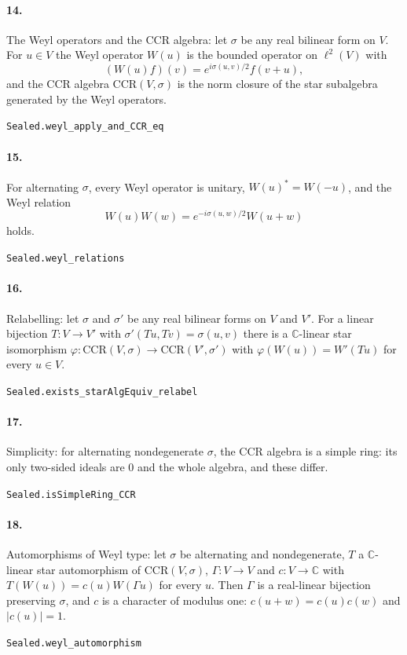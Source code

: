 \documentclass[11pt]{article}
\begin{document}
\paragraph{14.} The Weyl operators and the CCR algebra: let $\sigma$ be any real bilinear form on $V$. For $u \in V$ the Weyl operator $W(u)$ is the bounded operator on $\ell^2(V)$ with \[(W(u) f)(v) = e^{i\sigma(u, v)/2} f(v + u),\] and the CCR algebra $\mathrm{CCR}(V, \sigma)$ is the norm closure of the star subalgebra generated by the Weyl operators.\par{\footnotesize\texttt{Sealed.weyl\_apply\_and\_CCR\_eq}}

\paragraph{15.} For alternating $\sigma$, every Weyl operator is unitary, $W(u)^* = W(-u)$, and the Weyl relation \[W(u) W(w) = e^{-i\sigma(u, w)/2} W(u + w)\] holds.\par{\footnotesize\texttt{Sealed.weyl\_relations}}

\paragraph{16.} Relabelling: let $\sigma$ and $\sigma'$ be any real bilinear forms on $V$ and $V'$. For a linear bijection $T : V \to V'$ with $\sigma'(Tu, Tv) = \sigma(u, v)$ there is a $\mathbb C$-linear star isomorphism $\varphi : \mathrm{CCR}(V, \sigma) \to \mathrm{CCR}(V', \sigma')$ with $\varphi(W(u)) = W'(Tu)$ for every $u \in V$.\par{\footnotesize\texttt{Sealed.exists\_starAlgEquiv\_relabel}}

\paragraph{17.} Simplicity: for alternating nondegenerate $\sigma$, the CCR algebra is a simple ring: its only two-sided ideals are $0$ and the whole algebra, and these differ.\par{\footnotesize\texttt{Sealed.isSimpleRing\_CCR}}

\paragraph{18.} Automorphisms of Weyl type: let $\sigma$ be alternating and nondegenerate, $T$ a $\mathbb C$-linear star automorphism of $\mathrm{CCR}(V, \sigma)$, $\Gamma : V \to V$ and $c : V \to \mathbb C$ with $T(W(u)) = c(u) W(\Gamma u)$ for every $u$. Then $\Gamma$ is a real-linear bijection preserving $\sigma$, and $c$ is a character of modulus one: $c(u + w) = c(u) c(w)$ and $|c(u)| = 1$.\par{\footnotesize\texttt{Sealed.weyl\_automorphism}}
\end{document}
